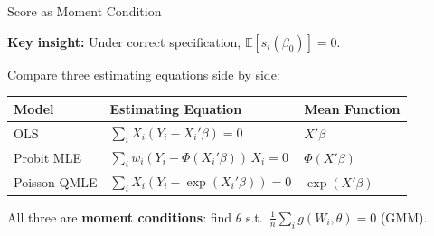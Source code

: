 \documentclass[aspectratio=169, handout, t]{beamer}
\numberwithin{equation}{section}
\begin{document}
\begin{frame}{Score as Moment Condition}

\textbf{Key insight:} Under correct specification, $\mathbb{E}[s_i(\beta_0)] = 0$.

\pause

\medskip

Compare three estimating equations side by side:

\smallskip

\renewcommand{\arraystretch}{1.6}
\begin{tabular}{lll}
\toprule
\textbf{Model} & \textbf{Estimating Equation} & \textbf{Mean Function} \\
\midrule
OLS & $\displaystyle\sum_i X_i(Y_i - X_i'\beta) = 0$ & $X'\beta$ \\[6pt]
Probit MLE & $\displaystyle\sum_i w_i(Y_i - \Phi(X_i'\beta))\, X_i = 0$ & $\Phi(X'\beta)$ \\[6pt]
Poisson QMLE & $\displaystyle\sum_i X_i(Y_i - \exp(X_i'\beta)) = 0$ & $\exp(X'\beta)$ \\[6pt]
\bottomrule
\end{tabular}
\renewcommand{\arraystretch}{1.0}

\pause

\smallskip

All three are \textbf{moment conditions}: find $\theta$ s.t.\ $\frac{1}{n}\sum_i g(W_i, \theta) = 0$ (GMM).

\end{frame}

\end{document}
